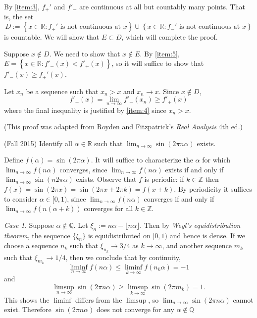 \documentclass[answers]{exam}
\theoremstyle{problemstyle}
\newcommand{\1}[1]{\textbf{1}_{\left[#1\right]}} %
\def\limn{\lim_{n\to\infty}} %
\def\R{\mathbb{R}} %
\def\Z{\mathbb{Z}} %
\def\Q{\mathbb{Q}} %
\begin{document}
\begin{questions}
\begin{solution}
By \ref{item:3}, $f_{+}'$ and $f'_{-}$ are continuous at all but countably many points. That is, the set  $$D:=\left\{ x\in \R: f_{+}'\text{ is not continuous at }x \right\}\cup \left\{ x\in \R: f_{-}'\text{ is not continuous at }x \right\}$$ is countable. We will show that $E\subset D$, which will complete the proof.

Suppose $x\notin D$. We need to show that $x\notin E$. By \ref{item:5}, $E=\left\{ x\in \R : f'_{-}(x)< f'_{+}(x) \right\}$, so it will suffice to show that $f'_{-}(x)\geq f_{+}'(x)$.

Let $x_{n}$ be a sequence such that $x_{n}>x$ and $x_{n}\to x$. Since $x\notin D$,
\begin{equation*}
  f'_{-}(x)=\limn f'_{-}(x_{n})\geq f'_{+}(x)
\end{equation*}
where the final inequality is justified by \ref{item:4} since $x_{n}>x$.

(This proof was adapted from Royden and Fitzpatrick's \textit{Real Analysis} 4th ed.)
\end{solution}

\question (Fall 2015) Identify all $\alpha\in \R$ such that $\lim_{n\to\infty} \sin(2 \pi n \alpha)$ exists.

\begin{solution}
	Define $f(\alpha)=\sin(2\pi \alpha)$. It will suffice to characterize the $\alpha$ for which $\limn f(n\alpha)$ converges, since $\limn f(n\alpha)$ exists if and only if $\limn \sin(n2\pi \alpha)$ exists. Observe that $f$ is periodic: if $k\in \Z$ then $f(x)=\sin(2\pi x) = \sin(2\pi x +2\pi k) =f(x+k)$. By periodicity it suffices to consider $\alpha\in [0,1)$, since $\limn f(n\alpha)$ converges if and only if $\limn f(n(\alpha+k))$ converges for all $k\in \Z$. 

  \textit{Case 1.} Suppose $\alpha \notin \Q$. Let $\xi_{n}:= n\alpha - \lfloor n\alpha \rfloor$. Then by \emph{Weyl's equidistribution theorem}, the sequence $\{ \xi_{n} \}$ is equidistributed on $[0,1)$ and hence is dense. If we choose a sequence $n_k$ such that $\xi_{n_k} \to 3/4$ as $k \to \infty$, and another sequence $m_k$ such that $\xi_{m_k} \to 1/4$, then we conclude that by continuity,
  \[ \liminf_{n \to \infty} f(n \alpha) \leq \liminf_{k \to \infty} f(n_k \alpha) = -1 \]
  and
  \[ \limsup_{n \to \infty} \sin(2 \pi n \alpha) \geq \limsup_{k \to \infty} \sin(2 \pi m_k) = 1. \]
  This shows the $\liminf$ differs from the $\limsup$, so $\limn \sin(2 \pi n \alpha)$ cannot exist. Therefore $\sin(2\pi n \alpha)$ does not converge for any $\alpha\notin \Q$
  

\end{solution}
\end{questions}
\end{document}
